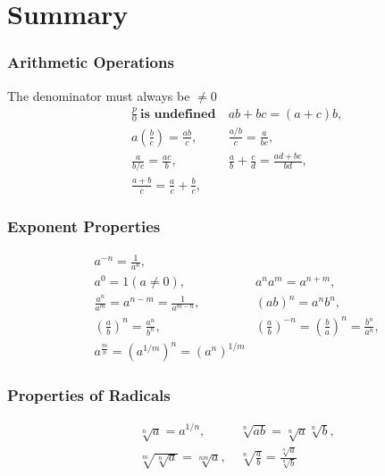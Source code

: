 \documentclass[10pt,a4paper]{book}
\theoremstyle{definition}\newtheorem{definition}{Definition}
\theoremstyle{definition}\newtheorem{fact}{Fact}
\theoremstyle{definition}\newtheorem{ex}{Ex.}
\theoremstyle{definition}\newtheorem{project}{Project}
\theoremstyle{definition}\newtheorem{problem}{Problem}
\theoremstyle{definition}\newtheorem{example}{Example}
\numberwithin{theorem}{chapter}
\numberwithin{corollary}{chapter}
\numberwithin{assumption}{chapter}
\numberwithin{definition}{chapter}
\numberwithin{prop}{chapter}
\numberwithin{notation}{chapter}
\numberwithin{problem}{chapter}
\numberwithin{example}{chapter}
\numberwithin{fact}{chapter}
\numberwithin{ex}{chapter}
\begin{document}
	\newpage
	
	\section{Summary}
	
	\subsubsection{Arithmetic Operations}
	The denominator must always be $\neq 0$
	\begin{align*}
		& \frac{p}{0} \ \textbf{is undefined} \         
		& ab + bc = (a+c)b,                             \\
		& a \left(\frac{b}{c}\right) = \frac{ab}{c}, \  
		& \frac{a/b}{c} = \frac{a}{bc},                 \\
		& \frac{a}{b/c} = \frac{ac}{b}, \               
		& \frac{a}{b} + \frac{c}{d} = \frac{ad+bc}{bd}, \\
		& \frac{a+b}{c} = \frac{a}{c} + \frac{b}{c}, \  
	\end{align*}
	
	\subsubsection{Exponent Properties}
	\begin{align*}
		& a^{-n} = \frac{1}{a^n},                                                         \\
		& a^0 = 1 (a\neq 0), \                                                            
		& a^n a^m = a^{n+m},                                                              \\
		& \frac{a^n}{a^m} = a^{n-m} = \frac{1}{a^{m-n}}, \                                
		& (ab)^n = a^n b^n,                                                               \\
		& \left(\frac{a}{b}\right)^n = \frac{a^n}{b^n}, \                                 
		& \left(\frac{a}{b}\right)^{-n} = \left(\frac{b}{a}\right)^{n} = \frac{b^n}{a^n}, \\
		& a^{\frac{m}{n}} = (a^{1/m})^n = (a^{n})^{1/m}                                   
	\end{align*}
	
	\subsubsection{Properties of Radicals}
	\begin{align*}
		& \sqrt[n]{a} = a^{1/n}, \                                
		& \sqrt[n]{ab} = \sqrt[n]{a} \sqrt[n]{b},                 \\
		& \sqrt[m]{\sqrt[n]{a}} = \sqrt[nm]{a}, \                 
		& \sqrt[n]{\frac{a}{b}} = \frac{\sqrt[n]{a}}{\sqrt[n]{b}} 
	\end{align*}
	
\end{document}
